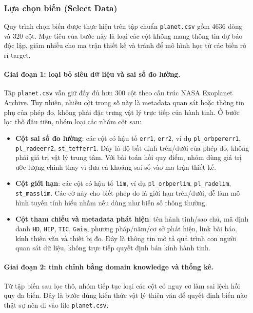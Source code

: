 \subsubsection{Lựa chọn biến (Select Data)}

Quy trình chọn biến được thực hiện trên tập chuẩn \texttt{planet.csv} gồm 4636 dòng và 320
cột. Mục tiêu của bước này là loại các cột không mang thông tin dự báo độc lập, giảm nhiễu cho ma
trận thiết kế và tránh để mô hình học từ các biến rò rỉ target.

\paragraph{Giai đoạn 1: loại bỏ siêu dữ liệu và sai số đo lường.}
Tập \texttt{planet.csv} vẫn giữ đầy đủ hơn 300 cột theo cấu trúc NASA Exoplanet Archive.
Tuy nhiên, nhiều cột trong số này là metadata quan sát hoặc thông tin phụ của phép đo, không phải
đặc trưng vật lý trực tiếp của hành tinh. Ở bước lọc thô đầu tiên, nhóm loại các nhóm cột sau:
\begin{itemize}
    \item \textbf{Cột sai số đo lường}: các cột có hậu tố \texttt{err1}, \texttt{err2}, ví dụ
          \texttt{pl\_orbpererr1}, \texttt{pl\_radeerr2}, \texttt{st\_tefferr1}. Đây là độ bất
          định trên/dưới của phép đo, không phải giá trị vật lý trung tâm. Với bài toán hồi quy
          điểm, nhóm dùng giá trị ước lượng chính thay vì đưa cả khoảng sai số vào ma trận thiết kế.
    \item \textbf{Cột giới hạn}: các cột có hậu tố \texttt{lim}, ví dụ \texttt{pl\_orbperlim},
          \texttt{pl\_radelim}, \texttt{st\_masslim}. Các cờ này cho biết phép đo là giới hạn
          trên/dưới, dễ làm mô hình tuyến tính hiểu nhầm nếu dùng như biến số thông thường.
    \item \textbf{Cột tham chiếu và metadata phát hiện}: tên hành tinh/sao chủ, mã định danh
          \texttt{HD}, \texttt{HIP}, \texttt{TIC}, \texttt{Gaia}, phương pháp/năm/cơ sở phát hiện,
          link bài báo, kính thiên văn và thiết bị đo. Đây là thông tin mô tả quá trình con người
          quan sát dữ liệu, không trực tiếp quyết định bán kính hành tinh.
\end{itemize}

\paragraph{Giai đoạn 2: tinh chỉnh bằng domain knowledge và thống kê.}
Từ tập biến sau lọc thô, nhóm tiếp tục loại các cột có nguy cơ làm sai lệch hồi quy đa biến. Đây là
bước dùng kiến thức vật lý thiên văn để quyết định biến nào thật sự nên đi vào file
\texttt{planet.csv}.

